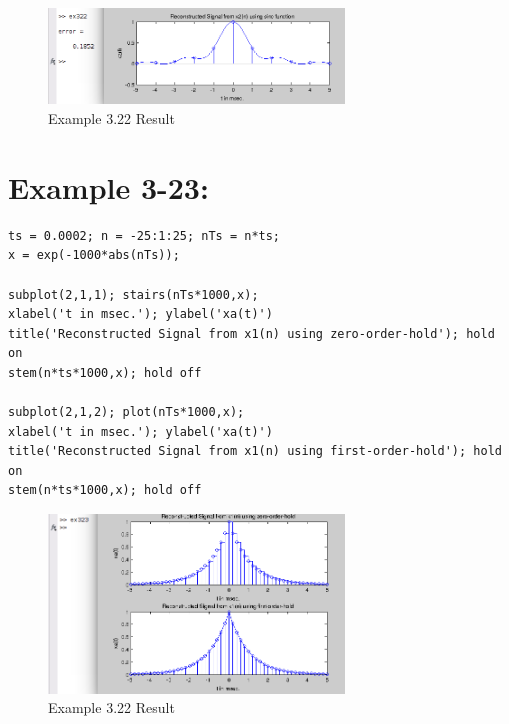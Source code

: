 \documentclass[11pt
  , a4paper
  , article
  , oneside
]{memoir}
\begin{document}
\begin{figure}[h!]
	\centering
	\includegraphics[width=0.7\textwidth,height=0.4\textwidth]{./images/ex322.png}
	\caption{Example 3.22 Result}
	\label{fig:Example 3-22 Result}
\end{figure}

\chapter{Example 3-23:}
\begin{lstlisting}[style=termstyle]
% Example 3.23
ts = 0.0002; n = -25:1:25; nTs = n*ts;
x = exp(-1000*abs(nTs));

subplot(2,1,1); stairs(nTs*1000,x);
xlabel('t in msec.'); ylabel('xa(t)')
title('Reconstructed Signal from x1(n) using zero-order-hold'); hold on
stem(n*ts*1000,x); hold off

subplot(2,1,2); plot(nTs*1000,x);
xlabel('t in msec.'); ylabel('xa(t)')
title('Reconstructed Signal from x1(n) using first-order-hold'); hold on
stem(n*ts*1000,x); hold off
\end{lstlisting}

\begin{figure}[h!]
	\centering
	\includegraphics[width=0.7\textwidth,height=0.4\textwidth]{./images/ex323.png}
	\caption{Example 3.22 Result}
	\label{fig:Example 3-23 Result}
\end{figure}

\clearpage
\end{document}
